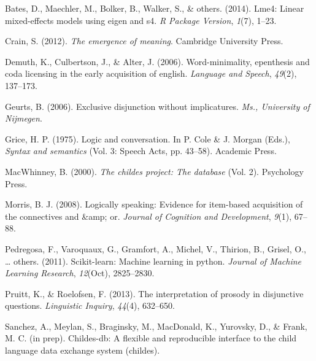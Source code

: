 \documentclass[10pt, letterpaper]{article}
\begin{document}
\hypertarget{refs}{}
\hypertarget{ref-bates2014lme4}{}
Bates, D., Maechler, M., Bolker, B., Walker, S., \& others. (2014).
Lme4: Linear mixed-effects models using eigen and s4. \emph{R Package
Version}, \emph{1}(7), 1--23.

\hypertarget{ref-crain2012emergence}{}
Crain, S. (2012). \emph{The emergence of meaning}. Cambridge University
Press.

\hypertarget{ref-demuth2006word}{}
Demuth, K., Culbertson, J., \& Alter, J. (2006). Word-minimality,
epenthesis and coda licensing in the early acquisition of english.
\emph{Language and Speech}, \emph{49}(2), 137--173.

\hypertarget{ref-geurts2006exclusive}{}
Geurts, B. (2006). Exclusive disjunction without implicatures.
\emph{Ms., University of Nijmegen}.

\hypertarget{ref-grice1975logicconvo}{}
Grice, H. P. (1975). Logic and conversation. In P. Cole \& J. Morgan
(Eds.), \emph{Syntax and semantics} (Vol. 3: Speech Acts, pp. 43--58).
Academic Press.

\hypertarget{ref-macwhinney2000childes}{}
MacWhinney, B. (2000). \emph{The childes project: The database} (Vol.
2). Psychology Press.

\hypertarget{ref-morris2008logically}{}
Morris, B. J. (2008). Logically speaking: Evidence for item-based
acquisition of the connectives and \&amp; or. \emph{Journal of Cognition
and Development}, \emph{9}(1), 67--88.

\hypertarget{ref-pedregosa2011scikit}{}
Pedregosa, F., Varoquaux, G., Gramfort, A., Michel, V., Thirion, B.,
Grisel, O., \ldots{} others. (2011). Scikit-learn: Machine learning in
python. \emph{Journal of Machine Learning Research}, \emph{12}(Oct),
2825--2830.

\hypertarget{ref-pruitt2013interpretation}{}
Pruitt, K., \& Roelofsen, F. (2013). The interpretation of prosody in
disjunctive questions. \emph{Linguistic Inquiry}, \emph{44}(4),
632--650.

\hypertarget{ref-childesdb}{}
Sanchez, A., Meylan, S., Braginsky, M., MacDonald, K., Yurovsky, D., \&
Frank, M. C. (in prep). Childes-db: A flexible and reproducible
interface to the child language data exchange system (childes).
\end{document}
